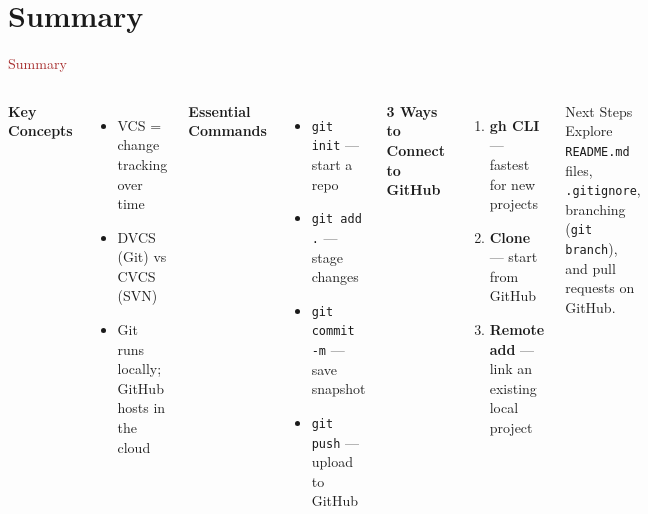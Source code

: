 \section{Summary}

\begin{frame}{\textcolor{brown}{Summary}}
  \begin{columns}[T]
      \textbf{Key Concepts}
      \begin{itemize}
        \item VCS = change tracking over time
        \item DVCS (Git) vs CVCS (SVN)
        \item Git runs locally; GitHub hosts in the cloud
      \end{itemize}

      \vspace{0.5em}
      \textbf{Essential Commands}
      \begin{itemize}
        \item \texttt{git init} — start a repo
        \item \texttt{git add .} — stage changes
        \item \texttt{git commit -m} — save snapshot
        \item \texttt{git push} — upload to GitHub
      \end{itemize}

      \textbf{3 Ways to Connect to GitHub}
      \begin{enumerate}
        \item \textbf{gh CLI} — fastest for new projects
        \item \textbf{Clone} — start from GitHub
        \item \textbf{Remote add} — link an existing local project
      \end{enumerate}

      \vspace{0.8em}
      \begin{block}{Next Steps}
        Explore \texttt{README.md} files, \texttt{.gitignore}, branching (\texttt{git branch}), and pull requests on GitHub.
      \end{block}
  \end{columns}
\end{frame}

